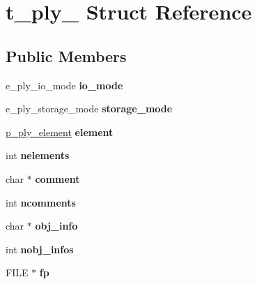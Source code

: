 \hypertarget{structt__ply__}{}\section{t\+\_\+ply\+\_\+ Struct Reference}
\label{structt__ply__}
\subsection*{Public Members}
\begin{DoxyCompactItemize}
\item 
\mbox{\label{structt__ply___a9be7c67e21b3920c3b7893d78f21c2e8}} 
e\+\_\+ply\+\_\+io\+\_\+mode {\bfseries io\+\_\+mode}
\item 
\mbox{\label{structt__ply___a2feb88c586425471d4b6e786a4525207}} 
e\+\_\+ply\+\_\+storage\+\_\+mode {\bfseries storage\+\_\+mode}
\item 
\mbox{\label{structt__ply___a7de540782943375c56f31074be82d207}} 
\hyperlink{structt__ply__element__}{p\+\_\+ply\+\_\+element} {\bfseries element}
\item 
\mbox{\label{structt__ply___a89dbce5badd1890fb6d7af773fb8e85d}} 
int {\bfseries nelements}
\item 
\mbox{\label{structt__ply___a3e3fe7d31c905da0fb259cdc9a99f47f}} 
char $\ast$ {\bfseries comment}
\item 
\mbox{\label{structt__ply___af7c25b823d754a567901060b35cdd019}} 
int {\bfseries ncomments}
\item 
\mbox{\label{structt__ply___a515f90aa2fce385e0e7d235de8361b07}} 
char $\ast$ {\bfseries obj\+\_\+info}
\item 
\mbox{\label{structt__ply___a1657577bce61808b345fc7aba9006ce6}} 
int {\bfseries nobj\+\_\+infos}
\item 
\mbox{\label{structt__ply___a0637e03cf8c826220eac2865e1c13cd4}} 
F\+I\+LE $\ast$ {\bfseries fp}
\item 
\mbox{\label{structt__ply___ac390febe0010255e5d9439ab6f1d6fcd}} 

\end{DoxyCompactItemize}
